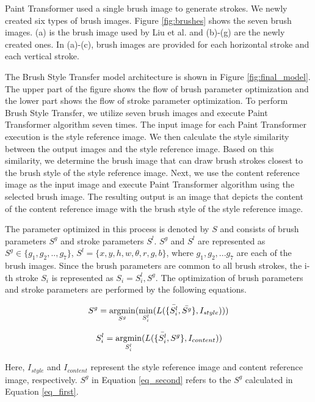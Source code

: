 \documentclass{mva_style}
\begin{document}
Paint Transformer used a single brush image to generate strokes. 
We newly created six types of brush images. Figure \ref{fig:brushes} shows 
the seven brush images. (a) is the brush image used by Liu et al. and (b)-(g) 
are the newly created ones. In (a)-(c), brush images are provided for each 
horizontal stroke and each vertical stroke.


The Brush Style Transfer model architecture is shown in Figure \ref{fig:final_model}.
The upper part of the figure shows the flow of brush parameter optimization and 
the lower part shows the flow of stroke parameter optimization. 
To perform Brush Style Transfer, we utilize seven brush images and execute 
Paint Transformer algorithm seven times. The input image for each Paint Transformer 
execution is the style reference image. We then calculate the style similarity 
between the output images and the style reference image. Based on this similarity, 
we determine the brush image that can draw brush strokes closest to the brush 
style of the style reference image. Next, we use the content reference image as 
the input image and execute Paint Transformer algorithm using the selected brush 
image. The resulting output is an image that depicts the content of the 
content reference image with the brush style of the style reference image.

The parameter optimized in this process is denoted by $S$ and consists of 
brush parameters $S^g$ and stroke parameters $S^l$. $S^g$ and $S^l$ are 
represented as $S^g \in \{g_1,g_2,..,g_7\}$, $S^l=\{x, y, h, w, \theta, r, g, b\}$, 
where $g_1, g_2,...g_7$ are each of the brush images.
Since the brush parameters are common to all brush strokes, the i-th stroke 
$S_i$ is represented as $S_i = {S_i^l, S^g}$. The optimization of brush 
parameters and stroke parameters are performed by the following equations.

\begin{equation}
  S^g = \mathop{\rm argmin}\limits_{S^g}(\mathop{\rm min}\limits_{S_i^l}(L(\{\bar{S_i^l}, \bar{S^g}\}, I_{style})))
  \label{eq_first}
\end{equation}

\begin{equation}
  S_i^l = \mathop{\rm argmin}\limits_{S_i^l}(L(\{\bar{S_i^l}, S^g\}, I_{content}))
  \label{eq_second}
\end{equation}

Here, $I_{style}$ and $I_{content}$  represent the style reference image and 
content reference image, respectively. $S^g$ in Equation \eqref{eq_second} 
refers to the $S^g$ calculated in Equation \eqref{eq_first}.
\end{document}
